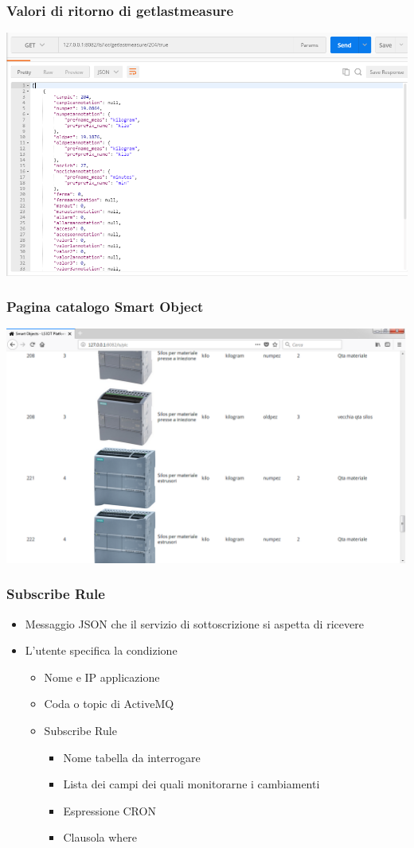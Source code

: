 \documentclass{beamer}
\begin{document}
\begin{frame}
\frametitle{Valori di ritorno di getlastmeasure}
\includegraphics[width=1\textwidth]{images/Postman1.png}
\end{frame}

\begin{frame}
\frametitle{Pagina catalogo Smart Object}
\includegraphics[width=1\textwidth]{images/SmartObjectsPlatform.png}
\end{frame}

\begin{frame}
\frametitle{Subscribe Rule}
\begin{itemize}
\item Messaggio JSON che il servizio di sottoscrizione si aspetta di ricevere
\item L'utente specifica la condizione
\begin{itemize}
\item Nome e IP applicazione
\item Coda o topic di ActiveMQ
\item Subscribe Rule
\begin{itemize}
\item Nome tabella da interrogare
\item Lista dei campi dei quali monitorarne i cambiamenti
\item Espressione CRON
\item Clausola where

\end{itemize}
\end{itemize}
\end{itemize}
\end{frame}
\end{document}
